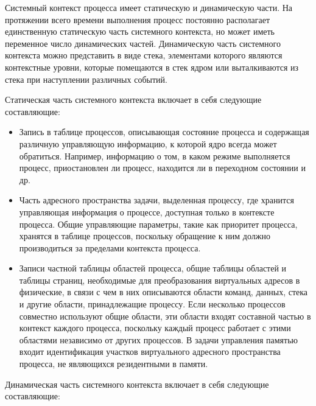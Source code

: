 \documentclass[14pt,a4paper,report]{report}
\begin{document}
Системный контекст процесса имеет статическую и динамическую части. На протяжении всего времени выполнения процесс постоянно располагает единственную статическую часть системного контекста, но может иметь переменное число динамических частей. Динамическую часть системного контекста можно представить в виде стека, элементами которого являются контекстные уровни, которые помещаются в стек ядром или выталкиваются из стека при наступлении различных событий.

Статическая часть системного контекста включает в себя следующие составляющие:

\begin{itemize}
	\item Запись в таблице процессов, описывающая состояние процесса и содержащая различную управляющую информацию, к которой ядро всегда может обратиться. Например, информацию о том, в каком режиме выполняется процесс, приостановлен ли процесс, находится ли в переходном состоянии и др.
	\item Часть адресного пространства задачи, выделенная процессу, где хранится управляющая информация о процессе, доступная только в контексте процесса. Общие управляющие параметры, такие как приоритет процесса, хранятся в таблице процессов, поскольку обращение к ним должно производиться за пределами контекста процесса.
	\item Записи частной таблицы областей процесса, общие таблицы областей и таблицы страниц, необходимые для преобразования виртуальных адресов в физические, в связи с чем в них описываются области команд, данных, стека и другие области, принадлежащие процессу. Если несколько процессов совместно используют общие области, эти области входят составной частью в контекст каждого процесса, поскольку каждый процесс работает с этими областями независимо от других процессов. В задачи управления памятью входит идентификация участков виртуального адресного пространства процесса, не являющихся резидентными в памяти.
\end{itemize}

Динамическая часть системного контекста включает в себя следующие составляющие:
\end{document}
